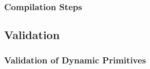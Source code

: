\subsubsection*{Compilation Steps}

\subsection{Validation}


\subsubsection*{Validation of Dynamic Primitives}

